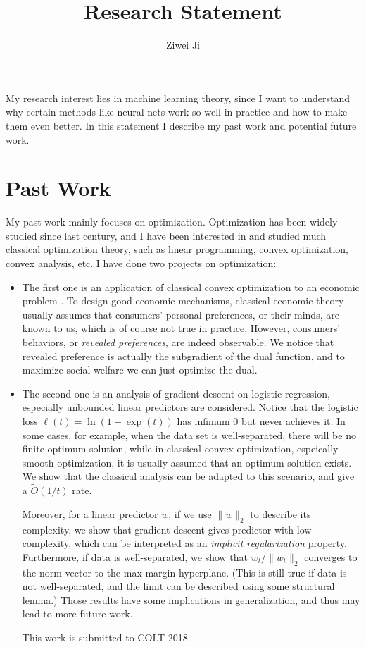 \documentclass{article}
\author{Ziwei Ji}
\title{Research Statement}
\theoremstyle{definition}
\theoremstyle{remark}
\begin{document}
\maketitle

My research interest lies in machine learning theory, since I want to understand why certain methods like neural nets work so well in practice and how to make them even better. In this statement I describe my past work and potential future work.

\section{Past Work}
My past work mainly focuses on optimization. Optimization has been widely studied since last century, and I have been interested in and studied much classical optimization theory, such as linear programming, convex optimization, convex analysis, etc. I have done two projects on optimization:
\begin{itemize}
    \item The first one is an application of classical convex optimization to an economic problem \citep{JRM17}. To design good economic mechanisms, classical economic theory usually assumes that consumers' personal preferences, or their minds, are known to us, which is of course not true in practice. However, consumers' behaviors, or \emph{revealed preferences}, are indeed observable. We notice that revealed preference is actually the subgradient of the dual function, and to maximize social welfare we can just optimize the dual.

    \item The second one is an analysis of gradient descent on logistic regression, especially unbounded linear predictors are considered. Notice that the logistic loss $\ell(t)=\ln\left(1+\exp(t)\right)$ has infimum $0$ but never achieves it. In some cases, for example, when the data set is well-separated, there will be no finite optimum solution, while in classical convex optimization, espeically smooth optimization, it is usually assumed that an optimum solution exists. We show that the classical analysis can be adapted to this scenario, and give a $\widetilde{O}(1/t)$ rate.

    Moreover, for a linear predictor $w$, if we use $\|w\|_2$ to describe its complexity, we show that gradient descent gives predictor with low complexity, which can be interpreted as an \emph{implicit regularization} property. Furthermore, if data is well-separated, we show that $w_t/\|w_t\|_2$ converges to the norm vector to the max-margin hyperplane. (This is still true if data is not well-separated, and the limit can be described using some structural lemma.) Those results have some implications in generalization, and thus may lead to more future work.

    This work is submitted to COLT 2018.
\end{itemize}
\end{document}
